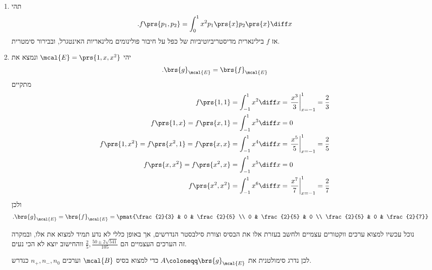 \documentclass[a4paper,10pt,twoside,openany]{book}
\begin{document}
\begin{solution}
\begin{enumerate}
\item תהי
\[\text{.} f\prs{p_1, p_2} = \int_0^1 x^2 p_1\prs{x} p_2\prs{x} \diff x\]
אז
$f$
בילינארית מדיסטריביוטיביות של כפל על חיבור פולינומים מלינאריות האינטגרל, ובבירור סימטרית.

\item יהי
$\mcal{E} = \prs{1, x, x^2}$
ונמצא את
\begin{align*}
\text{.} \brs{g}_{\mcal{E}} = \brs{f}_{\mcal{E}}
\end{align*}
מתקיים
\begin{align*}
f\prs{1, 1} &= \int_{-1}^1 x^2 \diff x = \left. \frac{x^3}{3} \right|_{x=-1}^1 = \frac{2}{3} \\
f\prs{1,x} = f\prs{x,1} &= \int_{-1}^1 x^3 \diff x = 0 \\
f\prs{1, x^2} = f\prs{x^2, 1} = f\prs{x, x} &= \int_{-1}^1 x^4 \diff x = \left. \frac{x^5}{5} \right|_{x=-1}^1 = \frac{2}{5}  \\
f\prs{x, x^2} = f\prs{x^2, x} &= \int_{-1}^1 x^5 \diff x = 0 \\
f\prs{x^2, x^2} &= \int_{-1}^1 x^6 \diff x = \left. \frac{x^7}{7} \right|_{x=-1}^1 = \frac{2}{7}
\end{align*}
ולכן
\begin{align*}
\text{.} \brs{g}_{\mcal{E}} = \brs{f}_{\mcal{E}} = \pmat{\frac{2}{3} & 0 & \frac{2}{5} \\ 0 & \frac{2}{5} & 0 \\ \frac{2}{5} & 0 & \frac{2}{7}}
\end{align*}

נוכל עכשיו למצוא ערכים ווקטורים עצמיים ולחשב בעזרת אלו את הבסיס וצורת סילבסטר הנדרשים, אך באופן כללי לא נדע תמיד למצוא את אלו, ובמקרה זה הערכים העצמיים הם
$\frac{2}{5}, \frac{50 \pm 2 \sqrt{541}}{105}$
ווהחישוב יוצא לא הכי נעים.

לכן נדרג סימולטנית את
$A \coloneqq \brs{g}_{\mcal{E}}$
כדי למצוא בסיס
$\mcal{B}$
וערכים
$n_+, n_-, n_0$
כנדרש.


\end{enumerate}
\end{solution}
\end{document}
